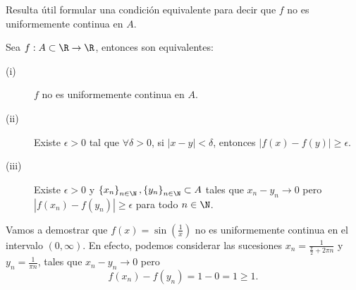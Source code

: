 Resulta útil formular una condición equivalente para decir que $\displaystyle f $ no es uniformemente continua en $\displaystyle A $.
\begin{fprop}
\normalfont Sea $\displaystyle f : A \subset \R \to \R $, entonces son equivalentes:
\begin{description}
\item[(i)] $\displaystyle f $ no es uniformemente continua en $\displaystyle A $.
\item[(ii)] Existe $\displaystyle \epsilon > 0 $ tal que $\displaystyle \forall \delta > 0 $, si $\displaystyle \left|x-y\right| < \delta  $, entonces $\displaystyle \left|f\left(x\right)-f\left(y\right)\right| \geq \epsilon  $.
\item[(iii)] Existe $\displaystyle \epsilon > 0 $ y $\displaystyle \left\{ x_{n}\right\} _{n\in\N}, \left\{ y_{n}\right\} _{n\in\N}\subset A $ tales que $\displaystyle x_{n}-y_{n} \to 0 $ pero $\displaystyle \left|f\left(x_{n}\right)-f\left(y_{n}\right)\right| \geq \epsilon  $ para todo $\displaystyle n \in \N $.
\end{description}
\end{fprop}
\begin{eg}
\normalfont Vamos a demostrar que $\displaystyle f\left(x\right) = \sin\left(\frac{1}{x}\right) $ no es uniformemente continua en el intervalo $\displaystyle \left(0, \infty\right) $. En efecto, podemos considerar las sucesiones $\displaystyle x_{n} = \frac{1}{\frac{\pi }{2} + 2\pi n} $ y $\displaystyle y_{n} = \frac{1}{\pi n} $, tales que $\displaystyle x_{n}-y_{n} \to 0 $ pero 
\[ f\left(x_{n}\right)-f\left(y_{n}\right) = 1 - 0=1 \geq 1 .\]
\end{eg}

